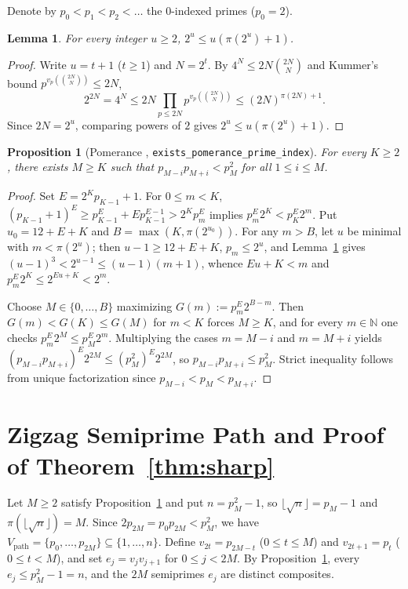 \documentclass[11pt]{amsart}
\newtheorem{proposition}[theorem]{Proposition}
\newtheorem{lemma}[theorem]{Lemma}
\begin{document}
Denote by $p_0 < p_1 < p_2 < \dots$ the $0$-indexed primes ($p_0 = 2$).

\begin{lemma}\label{lem:dyadic}
For every integer $u \ge 2$, $2^u \le u(\pi(2^u) + 1)$.
\end{lemma}
\begin{proof}
Write $u = t+1$ ($t \ge 1$) and $N = 2^t$. By $4^N \le 2N\binom{2N}{N}$ and Kummer's bound $p^{v_p(\binom{2N}{N})} \le 2N$,
\[
  2^{2N} = 4^N \le 2N \prod_{p \le 2N} p^{v_p(\binom{2N}{N})} \le (2N)^{\pi(2N)+1}.
\]
Since $2N = 2^u$, comparing powers of $2$ gives $2^u \le u(\pi(2^u)+1)$.
\end{proof}

\begin{proposition}[Pomerance {\cite{Po79}}, \texttt{exists\_pomerance\_prime\_index}]\label{prop:pom}
For every $K \ge 2$, there exists $M \ge K$ such that $p_{M-i}p_{M+i} < p_M^2$ for all $1 \le i \le M$.
\end{proposition}
\begin{proof}
Set $E = 2^K p_{K-1} + 1$. For $0 \le m < K$, $(p_{K-1}+1)^E \ge p_{K-1}^E + E p_{K-1}^{E-1} > 2^K p_m^E$ implies $p_m^E 2^K < p_K^E 2^m$. Put $u_0 = 12 + E + K$ and $B = \max(K, \pi(2^{u_0}))$. For any $m > B$, let $u$ be minimal with $m < \pi(2^u)$; then $u - 1 \ge 12 + E + K$, $p_m \le 2^u$, and Lemma~\ref{lem:dyadic} gives $(u-1)^3 < 2^{u-1} \le (u-1)(m+1)$, whence $E u + K < m$ and $p_m^E 2^K \le 2^{Eu+K} < 2^m$.

Choose $M \in \{0,\dots,B\}$ maximizing $G(m) := p_m^E 2^{B-m}$. Then $G(m) < G(K) \le G(M)$ for $m < K$ forces $M \ge K$, and for every $m \in \mathbb{N}$ one checks $p_m^E 2^M \le p_M^E 2^m$. Multiplying the cases $m = M - i$ and $m = M + i$ yields $(p_{M-i}p_{M+i})^E 2^{2M} \le (p_M^2)^E 2^{2M}$, so $p_{M-i}p_{M+i} \le p_M^2$. Strict inequality follows from unique factorization since $p_{M-i} < p_M < p_{M+i}$.
\end{proof}

\section{Zigzag Semiprime Path and Proof of Theorem~\ref{thm:sharp}}

Let $M \ge 2$ satisfy Proposition~\ref{prop:pom} and put $n = p_M^2 - 1$, so $\lfloor\sqrt{n}\rfloor = p_M - 1$ and $\pi(\lfloor\sqrt{n}\rfloor) = M$. Since $2p_{2M} = p_0 p_{2M} < p_M^2$, we have $V_{\mathrm{path}} = \{p_0,\dots,p_{2M}\} \subseteq \{1,\dots,n\}$. Define $v_{2t} = p_{2M-t}$ ($0 \le t \le M$) and $v_{2t+1} = p_t$ ($0 \le t < M$), and set $e_j = v_j v_{j+1}$ for $0 \le j < 2M$. By Proposition~\ref{prop:pom}, every $e_j \le p_M^2 - 1 = n$, and the $2M$ semiprimes $e_j$ are distinct composites.
\end{document}
